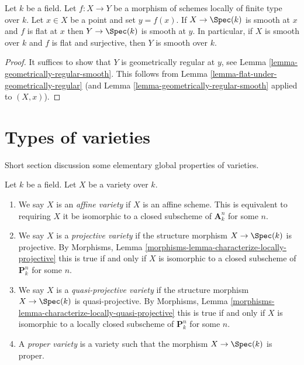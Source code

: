 \begin{lemma}
\label{lemma-flat-under-smooth}
Let $k$ be a field. Let $f : X \to Y$ be a morphism of schemes locally
of finite type over $k$. Let $x \in X$ be a point and set $y = f(x)$.
If $X \to \Spec(k)$ is smooth at $x$ and $f$ is flat at $x$
then $Y \to \Spec(k)$ is smooth at $y$. In particular, if $X$ is
smooth over $k$ and $f$ is flat and surjective, then $Y$ is smooth over $k$.
\end{lemma}

\begin{proof}
It suffices to show that $Y$ is geometrically regular at $y$, see
Lemma \ref{lemma-geometrically-regular-smooth}.
This follows from
Lemma \ref{lemma-flat-under-geometrically-regular}
(and
Lemma \ref{lemma-geometrically-regular-smooth}
applied to $(X, x)$).
\end{proof}




\section{Types of varieties}
\label{section-types}

\noindent
Short section discussion some elementary global properties of varieties.

\begin{definition}
\label{definition-variety-type}
Let $k$ be a field. Let $X$ be a variety over $k$.
\begin{enumerate}
\item We say $X$ is an {\it affine variety} if $X$ is an affine scheme.
This is equivalent to requiring $X$ it be isomorphic to a closed
subscheme of $\mathbf{A}^n_k$ for some $n$.
\item We say $X$ is a {\it projective variety} if the
structure morphism $X \to \Spec(k)$ is projective. By
Morphisms, Lemma \ref{morphisms-lemma-characterize-locally-projective}
this is true if and only if $X$ is isomorphic to a closed
subscheme of $\mathbf{P}^n_k$ for some $n$.
\item We say $X$ is a {\it quasi-projective variety} if
the structure morphism $X \to \Spec(k)$ is quasi-projective. By
Morphisms, Lemma \ref{morphisms-lemma-characterize-locally-quasi-projective}
this is true if and only if $X$ is isomorphic to a
locally closed subscheme of $\mathbf{P}^n_k$ for some $n$.
\item A {\it proper variety} is a variety such that the
morphism $X \to \Spec(k)$ is proper.
\end{enumerate}
\end{definition}

